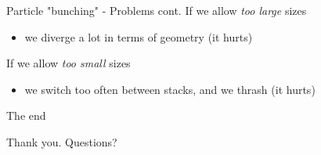 \documentclass{beamer}
\begin{document}
\begin{frame}{Particle "bunching" - Problems cont.}
If we allow \textit{too large} sizes
\begin{itemize}
\item we diverge a lot in terms of geometry (it hurts)
\end{itemize}
If we allow \textit{too small} sizes
\begin{itemize}
\item we switch too often between stacks, and we thrash (it hurts)
\end{itemize}
\end{frame}

\begin{frame}{The end}
\vspace*{\fill}
\begin{center}
Thank you. Questions?
\end{center}
\vspace*{\fill}
\end{frame}
\end{document}
